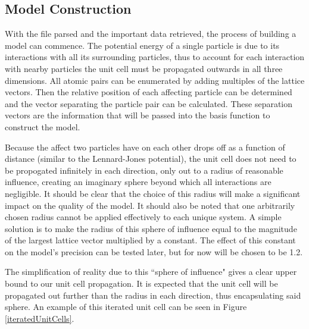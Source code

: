 \subsection{Model Construction}\label{Sect:procedureConstruction}
\par With the file parsed and the important data retrieved, the process of building a model can commence. The potential energy of a single particle is due to its interactions with all its surrounding particles, thus to account for each interaction with nearby particles the unit cell must be propagated outwards in all three dimensions. All atomic pairs can be enumerated by adding multiples of the lattice vectors. Then the relative position of each affecting particle can be determined and the vector separating the particle pair can be calculated. These separation vectors are the information that will be passed into the basis function to construct the model. 
\par Because the affect two particles have on each other drops off as a function of distance (similar to the Lennard-Jones potential), the unit cell does not need to be propogated infinitely in each direction, only out to a radius of reasonable influence, creating an imaginary sphere beyond which all interactions are negligible. It should be clear that the choice of this radius will make a significant impact on the quality of the model. It should also be noted that one arbitrarily chosen radius cannot be applied effectively to each unique system. A simple solution is to make the radius of this sphere of influence equal to the magnitude of the largest lattice vector multiplied by a constant. The effect of this constant on the model's precision can be tested later, but for now will be chosen to be 1.2.
\par The simplification of reality due to this ``sphere of influence" gives a clear upper bound to our unit cell propagation. It is expected that the unit cell will be propagated out further than the radius in each direction, thus encapsulating said sphere. An example of this iterated unit cell can be seen in Figure \ref{iteratedUnitCells}. 


